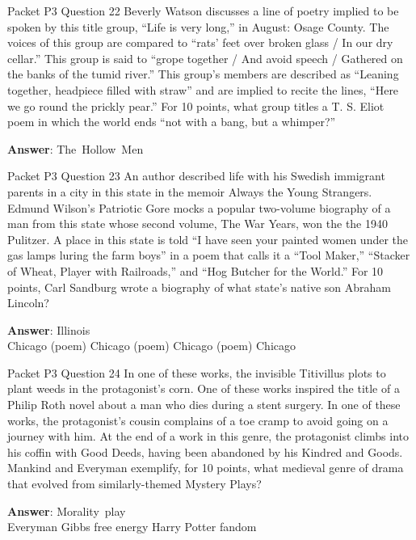 \begin{frame}{Packet P3 Question 22}
Beverly Watson discusses a line of poetry implied to be spoken by this title group, ``Life is very long,'' in August: Osage County. The voices of this group are compared to ``rats' feet over broken glass /   In our dry cellar.'' This group is said to ``grope together / And avoid speech / Gathered on the banks of the tumid river.'' This group's members are described as ``Leaning together, headpiece filled with straw'' and are implied   to recite the lines,   ``Here we go round the prickly pear.''   For 10 points, what group titles a T. S. Eliot poem in which the world ends ``not with a bang, but a whimper?''

\textbf{Answer}: The\ Hollow\ Men\\
\end{frame}

\begin{frame}{Packet P3 Question 23}
An author described life with his Swedish immigrant parents in a city in this state in the memoir Always the Young Strangers. Edmund Wilson’s Patriotic Gore mocks a popular two-volume biography of a man from this state whose second volume, The War Years, won the the 1940 Pulitzer. A place in this state is told “I have seen your painted women under the gas lamps luring the farm boys” in a poem that calls it a “Tool Maker,” “Stacker of Wheat, Player with Railroads,” and “Hog Butcher for the World.”   For 10 points, Carl Sandburg wrote a biography     of what state’s native son Abraham Lincoln?  

\textbf{Answer}: Illinois\\
 Chicago (poem)
 Chicago (poem)
 Chicago (poem)
 Chicago
\end{frame}

\begin{frame}{Packet P3 Question 24}
In one of these works, the invisible Titivillus plots to plant weeds in the protagonist’s corn. One of these works inspired the title of a Philip Roth novel about a man who dies during a stent surgery. In one of these works, the protagonist’s cousin complains of a toe cramp to avoid going on a journey with him. At the end of a work in this genre, the protagonist climbs into his coffin with Good Deeds, having been abandoned by his Kindred and Goods. Mankind and Everyman exemplify,   for 10 points, what medieval genre of   drama that evolved from similarly-themed Mystery Plays?    

\textbf{Answer}: Morality\ play\\
 Everyman
 Gibbs free energy
 Harry Potter fandom
\end{frame}


